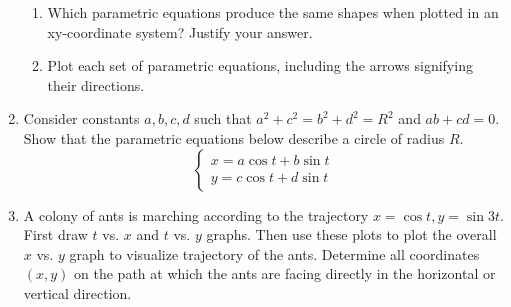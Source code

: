 \begin{enumerate}
    \begin{enumerate}
        \item Which parametric equations produce the same shapes when plotted in an xy-coordinate system? Justify your answer.
        
        \item Plot each set of parametric equations, including the arrows signifying their directions.
    \end{enumerate}

    \item Consider constants $a,b,c,d$ such that $a^2+c^2 = b^2+d^2 = R^2$ and $ab+cd=0$. Show that the parametric equations below describe a circle of radius $R$.
    \[
        \begin{cases}
        x = a\cos{t} + b\sin{t}\\
        y = c\cos{t} + d\sin{t}
        \end{cases}
    \]

    \item A colony of ants is marching according to the trajectory $x = \cos{t}, y=\sin{3t}$. First draw $t$ vs. $x$ and $t$ vs. $y$ graphs. Then use these plots to plot the overall $x$ vs. $y$ graph to visualize trajectory of the ants. Determine all coordinates $(x,y)$ on the path at which the ants are facing directly in the horizontal or vertical direction.
    
\end{enumerate}